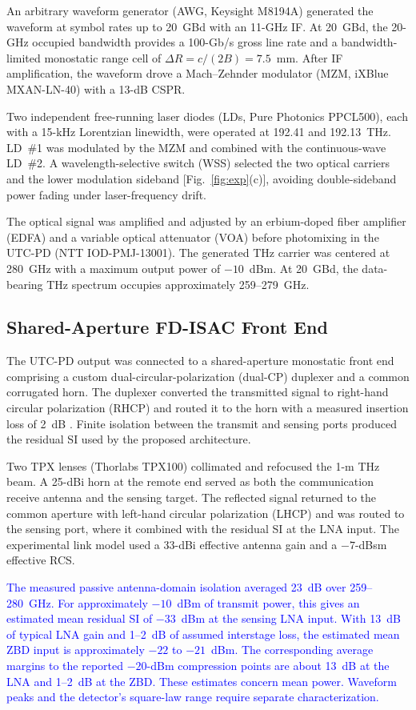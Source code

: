\documentclass[10pt,journal]{IEEEtran}
\DeclareRobustCommand{\rev}[1]{\textcolor{blue}{#1}}
\begin{document}
An arbitrary waveform generator (AWG, Keysight M8194A) generated the
waveform at symbol rates up to 20~GBd with an 11-GHz IF. At 20~GBd, the 20-GHz occupied bandwidth provides a
100-Gb/s gross line rate and a bandwidth-limited monostatic range cell
of $\Delta R=c/(2B)=7.5$~mm. After IF amplification, the waveform
drove a Mach--Zehnder modulator (MZM, iXBlue MXAN-LN-40) with a
13-dB CSPR.

Two independent free-running laser diodes
(LDs, Pure Photonics PPCL500), each with a 15-kHz Lorentzian
linewidth, were operated at 192.41 and 192.13~THz. LD~\#1 was
modulated by the MZM and combined with the continuous-wave LD~\#2.
A wavelength-selective switch (WSS) selected the two optical carriers
and the lower modulation sideband [Fig.~\ref{fig:exp}(c)], avoiding
double-sideband power fading under laser-frequency drift.

The optical signal was amplified and adjusted by an erbium-doped
fiber amplifier (EDFA) and a variable optical attenuator (VOA) before
photomixing in the UTC-PD (NTT IOD-PMJ-13001). The generated THz
carrier was centered at 280~GHz with a maximum output power of
$-10$~dBm. At 20~GBd, the data-bearing THz spectrum occupies
approximately 259--279~GHz.

\subsection{Shared-Aperture FD-ISAC Front End}
\label{sec:setup_core}

The UTC-PD output was connected to a shared-aperture monostatic front
end comprising a custom dual-circular-polarization (dual-CP) duplexer
and a common corrugated horn. The duplexer converted the transmitted
signal to right-hand circular polarization (RHCP) and routed it to the
horn with a measured insertion loss of 2~dB
\cite{shu_wideband_2019}. Finite isolation between the transmit and
sensing ports produced the residual SI used by the proposed
architecture.

Two TPX lenses (Thorlabs TPX100) collimated and refocused the 1-m THz
beam. A 25-dBi horn at the remote end served as both the communication
receive antenna and the sensing target. The reflected signal returned
to the common aperture with left-hand circular polarization (LHCP) and
was routed to the sensing port, where it combined with the residual SI
at the LNA input. The experimental link model used a 33-dBi effective
antenna gain and a $-7$-dBsm effective RCS.

\rev{The measured passive antenna-domain isolation averaged 23~dB over
259--280~GHz. For approximately $-10$~dBm of transmit power, this
gives an estimated mean residual SI of $-33$~dBm at the sensing LNA
input. With 13~dB of typical LNA gain and 1--2~dB of assumed
interstage loss, the estimated mean ZBD input is approximately
$-22$ to $-21$~dBm. The corresponding average margins to the
reported $-20$-dBm compression points are about 13~dB at the LNA
and 1--2~dB at the ZBD. These estimates concern mean power.
Waveform peaks and the detector's square-law range require
separate characterization.}
\end{document}
